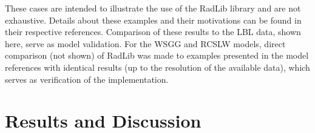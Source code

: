\documentclass[preprint,12pt]{elsarticle}
\begin{document}
These cases are intended to illustrate the use of the RadLib library and are not exhaustive. Details about these examples and their motivations can be found in their respective references. Comparison of these results to the LBL data, shown here, serve as model validation. For the WSGG and RCSLW models, direct comparison (not shown) of RadLib was made to examples presented in the model references with identical results (up to the resolution of the available data), which serves as verification of the implementation.



\section{Results and Discussion} \label{s:discussion}
\end{document}

